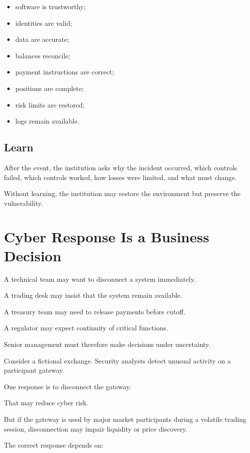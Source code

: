 \begin{itemize}
    \item software is trustworthy;
    \item identities are valid;
    \item data are accurate;
    \item balances reconcile;
    \item payment instructions are correct;
    \item positions are complete;
    \item risk limits are restored;
    \item logs remain available.
\end{itemize}

\subsection{Learn}

After the event, the institution asks why the incident occurred, which controls failed, which controls worked, how losses were limited, and what must change.

Without learning, the institution may restore the environment but preserve the vulnerability.

\section{Cyber Response Is a Business Decision}

A technical team may want to disconnect a system immediately.

A trading desk may insist that the system remain available.

A treasury team may need to release payments before cutoff.

A regulator may expect continuity of critical functions.

Senior management must therefore make decisions under uncertainty.

Consider a fictional exchange. Security analysts detect unusual activity on a participant gateway.

One response is to disconnect the gateway.

That may reduce cyber risk.

But if the gateway is used by major market participants during a volatile trading session, disconnection may impair liquidity or price discovery.

The correct response depends on:

